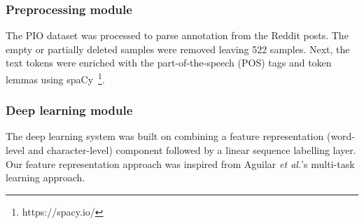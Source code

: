 \documentclass[11pt]{article}
\begin{document}
\subsubsection{Preprocessing module}
%
The PIO dataset was processed to parse annotation from the Reddit posts.
The empty or partially deleted samples were removed leaving 522 samples.
Next, the text tokens were enriched with the part-of-the-speech (POS) tags and token lemmas using spaCy~\footnote{https://spacy.io/}.
%
%
%
\subsubsection{Deep learning module}
%
%
%
The deep learning system was built on combining a feature representation (word-level and character-level) component followed by a linear sequence labelling layer.
Our feature representation approach was inspired from Aguilar \textit{et al.}'s multi-task learning approach.~\cite{aguilar2019multi}
%
%
%
\end{document}
